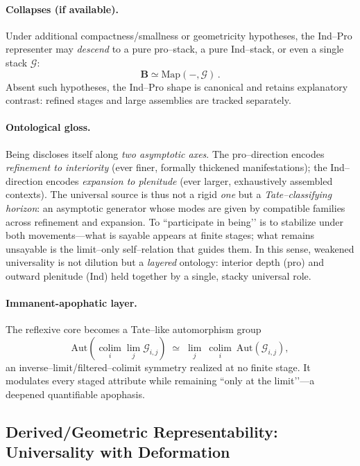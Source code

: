 \documentclass[11pt]{article}
\theoremstyle{upright}
\begin{document}
\paragraph{Collapses (if available).}
Under additional compactness/smallness or geometricity hypotheses, the Ind–Pro representer may \emph{descend} to a pure pro–stack, a pure Ind–stack, or even a single stack $\mathcal G$:
\[
\mathbf B \simeq \mathrm{Map}(-,\mathcal G)\,.
\]
Absent such hypotheses, the Ind–Pro shape is canonical and retains explanatory contrast: refined stages and large assemblies are tracked separately.

\paragraph{Ontological gloss.}
Being discloses itself along \emph{two asymptotic axes}. The pro–direction encodes \emph{refinement to interiority} (ever finer, formally thickened manifestations); the Ind–direction encodes \emph{expansion to plenitude} (ever larger, exhaustively assembled contexts). The universal source is thus not a rigid \emph{one} but a \emph{Tate–classifying horizon}: an asymptotic generator whose modes are given by compatible families across refinement and expansion. To “participate in being’’ is to stabilize under both movements—what is sayable appears at finite stages; what remains unsayable is the limit–only self–relation that guides them. In this sense, weakened universality is not dilution but a \emph{layered} ontology: interior depth (pro) and outward plenitude (Ind) held together by a single, stacky universal role.

\paragraph{Immanent-apophatic layer.}
The reflexive core becomes a Tate–like automorphism group
\[
\mathrm{Aut}\!\left(\operatorname*{colim}_i\operatorname*{lim}_j \mathcal G_{i,j}\right)
\;\simeq\;
\operatorname*{lim}_{j}\ \operatorname*{colim}_{i}\ \mathrm{Aut}(\mathcal G_{i,j}),
\]
an inverse–limit/filtered–colimit symmetry realized at no finite stage. It modulates every staged attribute while remaining “only at the limit’’—a deepened quantifiable apophasis.

\subsection{Derived/Geometric Representability: Universality with Deformation}\label{subsec:derived}
\end{document}
